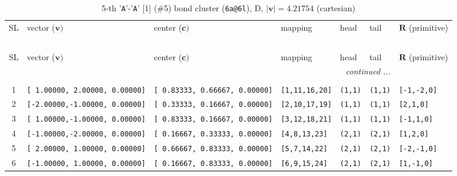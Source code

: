\documentclass[fleqn,10pt,landscape]{jsarticle}
\begin{document}
\begin{longtable}[l]{cllllll}
\captionsetup{justification=raggedright, singlelinecheck=off}
\caption{5-th '\texttt{A}'-'\texttt{A}' [1] (\#5) bond cluster (\texttt{6a@6l}), D, $|\bm{v}|=4.21754$ (cartesian)}
 \\
 \hline \hline
SL & vector ($\bm{v})$ & center ($\bm{c})$ & mapping & head & tail & $\bm{R}$ (primitive) \\ \hline \endfirsthead

\multicolumn{6}{l}{\tablename\ \thetable{}} \\
 \hline \hline
SL & vector ($\bm{v})$ & center ($\bm{c})$ & mapping & head & tail & $\bm{R}$ (primitive) \\ \hline \endhead

 \hline \hline
\multicolumn{6}{r}{\footnotesize\it continued ...} \\ \endfoot

 \hline \hline
\multicolumn{6}{r}{} \\ \endlastfoot

1 & \texttt{[ 1.00000, 2.00000, 0.00000]} & \texttt{[ 0.83333, 0.66667, 0.00000]} & \texttt{[1,11,16,20]} & \texttt{(1,1)} & \texttt{(1,1)} & \texttt{[-1,-2,0]} \\ \hline
2 & \texttt{[-2.00000,-1.00000, 0.00000]} & \texttt{[ 0.33333, 0.16667, 0.00000]} & \texttt{[2,10,17,19]} & \texttt{(1,1)} & \texttt{(1,1)} & \texttt{[2,1,0]} \\ \hline
3 & \texttt{[ 1.00000,-1.00000, 0.00000]} & \texttt{[ 0.83333, 0.16667, 0.00000]} & \texttt{[3,12,18,21]} & \texttt{(1,1)} & \texttt{(1,1)} & \texttt{[-1,1,0]} \\ \hline
4 & \texttt{[-1.00000,-2.00000, 0.00000]} & \texttt{[ 0.16667, 0.33333, 0.00000]} & \texttt{[4,8,13,23]} & \texttt{(2,1)} & \texttt{(2,1)} & \texttt{[1,2,0]} \\ \hline
5 & \texttt{[ 2.00000, 1.00000, 0.00000]} & \texttt{[ 0.66667, 0.83333, 0.00000]} & \texttt{[5,7,14,22]} & \texttt{(2,1)} & \texttt{(2,1)} & \texttt{[-2,-1,0]} \\ \hline
6 & \texttt{[-1.00000, 1.00000, 0.00000]} & \texttt{[ 0.16667, 0.83333, 0.00000]} & \texttt{[6,9,15,24]} & \texttt{(2,1)} & \texttt{(2,1)} & \texttt{[1,-1,0]} \\
\end{longtable}
\end{document}
